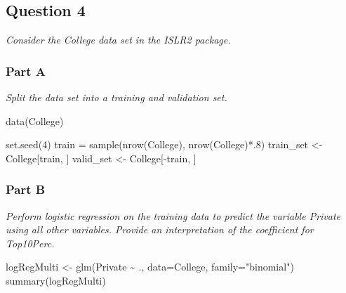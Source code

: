 \documentclass[
]{article}
\newenvironment{Shaded}{\begin{snugshade}}{\end{snugshade}}
\newcommand{\AttributeTok}[1]{\textcolor[rgb]{0.77,0.63,0.00}{#1}}
\newcommand{\DecValTok}[1]{\textcolor[rgb]{0.00,0.00,0.81}{#1}}
\newcommand{\FunctionTok}[1]{\textcolor[rgb]{0.00,0.00,0.00}{#1}}
\newcommand{\NormalTok}[1]{#1}
\newcommand{\OtherTok}[1]{\textcolor[rgb]{0.56,0.35,0.01}{#1}}
\newcommand{\SpecialCharTok}[1]{\textcolor[rgb]{0.00,0.00,0.00}{#1}}
\newcommand{\StringTok}[1]{\textcolor[rgb]{0.31,0.60,0.02}{#1}}
\begin{document}
\hypertarget{question-4}{%
\subsection{Question 4}\label{question-4}}

\emph{Consider the College data set in the ISLR2 package.}

\hypertarget{part-a-3}{%
\subsubsection{Part A}\label{part-a-3}}

\emph{Split the data set into a training and validation set.}

\begin{Shaded}
\begin{Highlighting}[]
\FunctionTok{data}\NormalTok{(College)}
\end{Highlighting}
\end{Shaded}

\begin{Shaded}
\begin{Highlighting}[]
\FunctionTok{set.seed}\NormalTok{(}\DecValTok{4}\NormalTok{)}
\NormalTok{train }\OtherTok{=} \FunctionTok{sample}\NormalTok{(}\FunctionTok{nrow}\NormalTok{(College), }\FunctionTok{nrow}\NormalTok{(College)}\SpecialCharTok{*}\NormalTok{.}\DecValTok{8}\NormalTok{)}
\NormalTok{train\_set }\OtherTok{\textless{}{-}}\NormalTok{ College[train, ]}
\NormalTok{valid\_set }\OtherTok{\textless{}{-}}\NormalTok{ College[}\SpecialCharTok{{-}}\NormalTok{train, ]}
\end{Highlighting}
\end{Shaded}

\hypertarget{part-b-3}{%
\subsubsection{Part B}\label{part-b-3}}

\emph{Perform logistic regression on the training data to predict the
variable Private using all other variables. Provide an interpretation of
the coefficient for Top10Perc.}

\begin{Shaded}
\begin{Highlighting}[]
\NormalTok{logRegMulti }\OtherTok{\textless{}{-}} \FunctionTok{glm}\NormalTok{(Private }\SpecialCharTok{\textasciitilde{}}\NormalTok{ ., }\AttributeTok{data=}\NormalTok{College, }\AttributeTok{family=}\StringTok{"binomial"}\NormalTok{)}
\FunctionTok{summary}\NormalTok{(logRegMulti)}
\end{Highlighting}
\end{Shaded}
\end{document}
